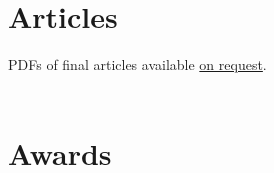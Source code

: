 \documentclass[%
  11pt,%
]{article}
\makeatletter
\newcommand{\onrequest}{\href{mailto:bennett.helm@fandm.edu}{on request}}
\makeatother
\begin{document}
\nocite{Helm2017Communities-Respect-Persons,Helm2010Love-Friendship-Self,Helm2001Emotional-Reason-Deliberation}

\printbibliography[heading=none]

\section{Articles}

\newrefsection
\nocite{*}


\begin{center}
  PDFs of final articles available \onrequest{}.\\
  ~
\end{center}

\printbibliography[filter=myarticle, heading=none]





\section{Awards}
\end{document}
